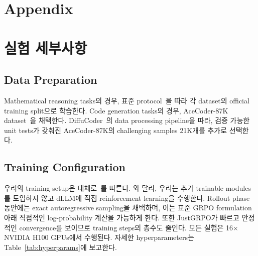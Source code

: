 \section*{Appendix}
\label{sec:appendix}

\section{실험 세부사항}
\label{app:experimental_setups}

\subsection{Data Preparation}
Mathematical reasoning tasks의 경우, 표준 protocol~\cite{zhao2025d1,ou2025principled}을 따라 각 dataset의 official training split으로 학습한다.
Code generation tasks의 경우, AceCoder-87K dataset~\cite{zeng2025acecoder}을 채택한다. DiffuCoder~\cite{gong2025diffucoder}의 data processing pipeline을 따라, 검증 가능한 unit tests가 갖춰진 AceCoder-87K의 challenging samples 21K개를 추가로 선택한다.

\subsection{Training Configuration}
우리의 training setup은 대체로~\cite{huang2025reinforcing}를 따른다.
\cite{huang2025reinforcing}와 달리, 우리는 추가 trainable modules를 도입하지 않고 dLLM에 직접 reinforcement learning을 수행한다.
Rollout phase 동안에는 exact autoregressive sampling을 채택하며, 이는 표준 GRPO formulation 아래 직접적인 log-probability 계산을 가능하게 한다.
또한 JustGRPO가 빠르고 안정적인 convergence를 보이므로 training steps의 총수도 줄인다.
모든 실험은 16$\times$ NVIDIA H100 GPUs에서 수행된다. 자세한 hyperparameters는 Table~\ref{tab:hyperparams}에 보고한다.


